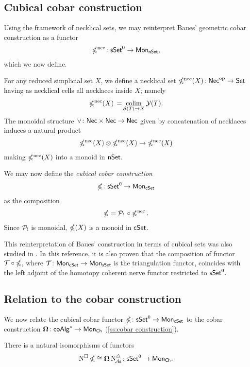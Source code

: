 \subsection{Cubical cobar construction}\label{ss:cubical cobar}

Using the framework of necklical sets, we may reinterpret Baues' geometric cobar construction \cite{baues1980geometry} as a functor
\[
\operatorname{\mathbb{\Omega}^{\mathrm{nec}}} \colon \mathsf{sSet}^0 \to \mathsf{Mon}_{\mathsf{nSet}},
\]
which we now define.

For any reduced simplicial set $X$, we define a necklical set $\operatorname{\mathbb{\Omega}^{\mathrm{nec}}}(X) \colon \mathsf{Nec}^{\mathrm{op}} \to \mathsf{Set}$ having as necklical cells all necklaces inside $X$; namely
\[
\operatorname{\mathbb{\Omega}^{\mathrm{nec}}}(X) \, = \! \operatorname*{colim}_{\mathcal{S}(T) \to X} \mathcal{Y}(T).
\]
The monoidal structure $\vee \colon \mathsf{Nec} \times \mathsf{Nec} \to \mathsf{Nec}$ given by concatenation of necklaces induces a natural product
\[
\operatorname{\mathbb{\Omega}^{\mathrm{nec}}}(X) \otimes \operatorname{\mathbb{\Omega}^{\mathrm{nec}}}(X) \to \operatorname{\mathbb{\Omega}^{\mathrm{nec}}}(X)
\]
making $\operatorname{\mathbb{\Omega}^{\mathrm{nec}}}(X)$ into a monoid in $\mathsf{nSet}$.

We may now define the \textit{cubical cobar construction}
\[
\operatorname{\mathbb{\Omega}} \colon \mathsf{sSet}^0 \to \mathsf{Mon}_{\mathsf{cSet}}
\]
as the composition
\[
\operatorname{\mathbb{\Omega}} = \mathcal{P}_! \, \circ \operatorname{\mathbb{\Omega}^{\mathrm{nec}}}.
\]
Since $\mathcal{P}_!$ is monoidal, $\operatorname{\mathbb{\Omega}}(X)$ is a monoid in $\mathsf{cSet}$.

\begin{remark}
	This reinterpretation of Baues' construction in terms of cubical sets was also studied in \cite{rivera2018cubical}.
	In this reference, it is also proven that the composition of functor $\mathcal{T} \circ \operatorname{\mathbb{\Omega}}$, where $\mathcal{T} \colon \mathsf{Mon}_{\mathsf{cSet}} \to \mathsf{Mon}_{\mathsf{sSet}}$ is the triangulation functor, coincides with the left adjoint of the homotopy coherent nerve functor restricted to $\mathsf{sSet}^0.$
\end{remark}

\subsection{Relation to the cobar construction}

We now relate the cubical cobar functor $\operatorname{\mathbb{\Omega}} \colon \mathsf{sSet}^0 \to \mathsf{Mon}_{\mathsf{cSet}}$ to the cobar construction $\operatorname{\mathbf{\Omega}} \colon \mathsf{coAlg}^\ast \to \mathsf{Mon}_{\mathsf{Ch}}$ (\cref{ss:cobar construction}).

\begin{theorem}\label{t:ccobar and cobar}
	There is a natural isomorphisms of functors
	\[
	\operatorname{N^{\square}} \operatorname{\mathbb{\Omega}} \cong \operatorname{\mathbf{\Omega}} \operatorname{N^{\triangle}_{\!{\mathcal{A}\mathsf{s}}}} \colon \mathsf{sSet}^0 \to \mathsf{Mon}_{\mathsf{Ch}}.
	\]
\end{theorem}

